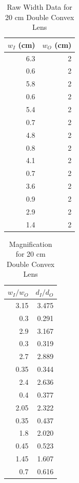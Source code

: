 \begin{table}[ht]
    \centering
    \begin{tabular}{|r|r|}
        \hline
        $w_{I}$ (cm) & $w_{O}$ (cm) \\
        \hline
        6.3 & 2 \\
        0.6 & 2 \\
        5.8 & 2 \\
        0.6 & 2 \\
        5.4 & 2 \\
        0.7 & 2 \\
        4.8 & 2 \\
        0.8 & 2 \\
        4.1 & 2 \\
        0.7 & 2 \\
        3.6 & 2 \\
        0.9 & 2 \\
        2.9 & 2 \\
        1.4 & 2 \\
        \hline
    \end{tabular}
    \caption{Raw Width Data for 20 cm Double Convex Lens}
    \label{table.08.width.20cm}
\end{table}
\begin{table}[ht]
    \centering
    \begin{tabular}{|r|r|}
        \hline
        $w_{I} / w_{O}$ & $d_{I} / d_{O}$ \\
        \hline
        3.15 & 3.475 \\
        0.3 & 0.291 \\
        2.9 & 3.167 \\
        0.3 & 0.319 \\
        2.7 & 2.889 \\
        0.35 & 0.344 \\
        2.4 & 2.636 \\
        0.4 & 0.377 \\
        2.05 & 2.322 \\
        0.35 & 0.437 \\
        1.8 & 2.020 \\
        0.45 & 0.523 \\
        1.45 & 1.607 \\
        0.7 & 0.616 \\
        \hline
    \end{tabular}
    \caption{Magnification for 20 cm Double Convex Lens}
    \label{table.08.magnification.20cm}
\end{table}

